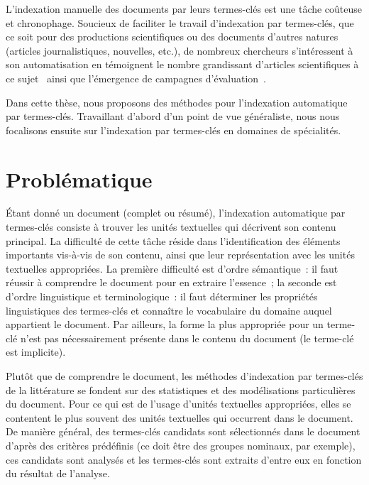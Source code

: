     L'indexation manuelle des documents par leurs termes-clés est une tâche
    coûteuse et chronophage. Soucieux de faciliter le travail d'indexation par
    termes-clés, que ce soit pour des productions scientifiques ou des documents
    d'autres natures (articles journalistiques, nouvelles, etc.), de nombreux
    chercheurs s'intéressent à son automatisation en témoignent le nombre
    grandissant d'articles scientifiques à ce
    sujet~\cite{hasan2014state_of_the_art} ainsi que l'émergence de campagnes
    d'évaluation~\cite{kim2010semeval,paroubek2012deft}.
    
    Dans cette thèse, nous
    proposons des méthodes pour l'indexation automatique par termes-clés.
    Travaillant d'abord d'un point de vue généraliste, nous nous focalisons
    ensuite sur l'indexation par termes-clés en domaines de spécialités.


  \section{Problématique}
  \label{sec:main-introduction-problem_statement}
    Étant donné un document (complet ou résumé), l'indexation automatique par
    termes-clés consiste à trouver les unités textuelles qui décrivent son
    contenu principal. La difficulté de cette tâche réside dans l'identification
    des éléments importants vis-à-vis de son contenu, ainsi que leur
    représentation avec les unités textuelles appropriées. La première
    difficulté est d'ordre sémantique~: il faut réussir à comprendre le document
    pour en extraire l'essence~; la seconde est d'ordre linguistique et
    terminologique~: il faut déterminer les propriétés linguistiques des
    termes-clés et connaître le vocabulaire du domaine auquel appartient le
    document. Par ailleurs, la forme la plus appropriée pour un terme-clé n'est
    pas nécessairement présente dans le contenu du document (le terme-clé est
    implicite).

    Plutôt que de comprendre le document, les méthodes d'indexation par
    termes-clés de la littérature se fondent sur des statistiques et
    des modélisations particulières du document. Pour ce qui est de l'usage
    d'unités textuelles appropriées, elles se contentent le plus souvent des
    unités textuelles qui occurrent dans le document. De manière général, des
    termes-clés candidats sont sélectionnés dans le document d'après des
    critères prédéfinis (ce doit être des groupes nominaux, par exemple), ces
    candidats sont analysés et les termes-clés sont extraits d'entre eux en
    fonction du résultat de l'analyse.

